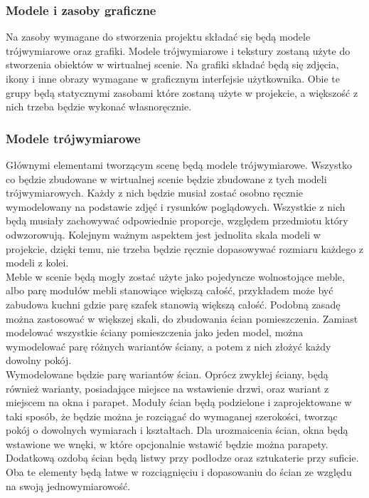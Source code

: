 \documentclass{article} %
\begin{document}
        \subsubsection{Modele i zasoby graficzne}
            Na zasoby wymagane do stworzenia projektu składać się będą modele trójwymiarowe oraz grafiki. Modele trójwymiarowe i tekstury zostaną użyte do stworzenia obiektów w wirtualnej scenie. Na grafiki składać będą się zdjęcia, ikony i inne obrazy wymagane w graficznym interfejsie użytkownika. Obie te grupy będą statycznymi zasobami które zostaną użyte w projekcie, a większość z nich trzeba będzie wykonać własnoręcznie.
            \\
        
        \subsubsection{Modele trójwymiarowe}
            Głównymi elementami tworzącym scenę będą modele trójwymiarowe. Wszystko co będzie zbudowane w wirtualnej scenie będzie zbudowane z tych modeli trójwymiarowych. Każdy z nich będzie musiał zostać osobno ręcznie wymodelowany na podstawie zdjęć i rysunków poglądowych. Wszystkie z nich będą musiały zachowywać odpowiednie proporcje, względem przedmiotu który odwzorowują. Kolejnym ważnym aspektem jest jednolita skala modeli w projekcie, dzięki temu, nie trzeba będzie ręcznie dopasowywać rozmiaru każdego z modeli z kolei.
            \\
            
            Meble w scenie będą mogły zostać użyte jako pojedyncze wolnostojące meble, albo parę modułów mebli stanowiące większą całość, przykładem może być zabudowa kuchni gdzie parę szafek stanowią większą całość. Podobną zasadę można zastosować w większej skali, do zbudowania ścian pomieszczenia. Zamiast modelować wszystkie ściany pomieszczenia jako jeden model, można wymodelować parę różnych wariantów ściany, a potem z nich złożyć każdy dowolny pokój.
            \\
            
            Wymodelowane będzie parę wariantów ścian. Oprócz zwykłej ściany, będą również warianty, posiadające miejsce na wstawienie drzwi, oraz wariant z miejscem na okna i parapet. Moduły ścian będą podzielone i zaprojektowane w taki sposób, że będzie można je rozciągać do wymaganej szerokości, tworząc pokój o dowolnych wymiarach i kształtach. Dla urozmaicenia ścian, okna będą wstawione we wnęki, w które opcjonalnie wstawić będzie można parapety. Dodatkową ozdobą ścian będą listwy przy podłodze oraz sztukaterie przy suficie. Oba te elementy będą łatwe w rozciągnięciu i dopasowaniu do ścian ze względu na swoją jednowymiarowość.
            \\
            
\end{document}
